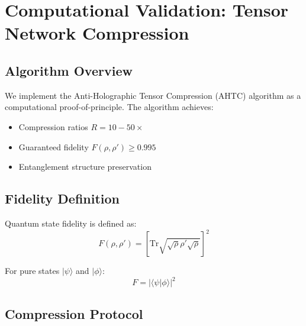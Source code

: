 \documentclass[twocolumn,aps,prd,superscriptaddress,nofootinbib]{revtex4-2}
\begin{document}
\section{Computational Validation: Tensor Network Compression}

\subsection{Algorithm Overview}

We implement the Anti-Holographic Tensor Compression (AHTC) algorithm as a computational proof-of-principle. The algorithm achieves:
\begin{itemize}
    \item Compression ratios $R = 10-50\times$
    \item Guaranteed fidelity $F(\rho, \rho') \geq 0.995$
    \item Entanglement structure preservation
\end{itemize}

\subsection{Fidelity Definition}

Quantum state fidelity is defined as:
\begin{equation}
F(\rho, \rho') = \left[\text{Tr}\sqrt{\sqrt{\rho}\rho'\sqrt{\rho}}\right]^2
\label{eq:fidelity}
\end{equation}

For pure states $|\psi\rangle$ and $|\phi\rangle$:
\begin{equation}
F = |\langle \psi | \phi \rangle|^2
\end{equation}

\subsection{Compression Protocol}
\end{document}
